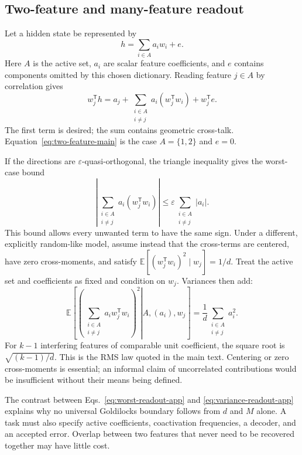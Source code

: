 \documentclass[
  aps,
  reprint,
  superscriptaddress,
  floatfix,
  nofootinbib,
  longbibliography
]{revtex4-2}
\newcommand{\E}{\mathbb{E}}
\newcommand{\T}{^{\mathsf T}}
\begin{document}
\subsection{Two-feature and many-feature readout}

Let a hidden state be represented by
\begin{equation}
 h=\sum_{i\in A}a_iw_i+e.
 \label{eq:feature-code-app}
\end{equation}
Here $A$ is the active set, $a_i$ are scalar feature coefficients, and $e$ contains
components omitted by this chosen dictionary.  Reading feature $j\in A$ by
correlation gives
\begin{equation}
 w_j\T h
 =a_j+\sum_{\substack{i\in A\\i\ne j}}
 a_i(w_j\T w_i)+w_j\T e.
 \label{eq:readout-app}
\end{equation}
The first term is desired; the sum contains geometric cross-talk.
Equation~\eqref{eq:two-feature-main} is the case $A=\{1,2\}$ and $e=0$.

If the directions are $\varepsilon$-quasi-orthogonal, the triangle inequality
gives the worst-case bound
\begin{equation}
 \left|
 \sum_{\substack{i\in A\\i\ne j}}a_i(w_j\T w_i)
 \right|
 \leq\varepsilon\sum_{\substack{i\in A\\i\ne j}}|a_i|.
 \label{eq:worst-readout-app}
\end{equation}
This bound allows every unwanted term to have the same sign.  Under a
different, explicitly random-like model, assume instead that the cross-terms
are centered, have zero cross-moments, and satisfy
$\E[(w_j\T w_i)^2\mid w_j]=1/d$.  Treat the active set and coefficients as fixed
and condition on $w_j$.  Variances then add:
\begin{equation}
 \E\!\left[
 \left.
 \left(\sum_{\substack{i\in A\\i\ne j}}a_iw_j\T w_i\right)^2
 \right|A,(a_i),w_j
 \right]
 =\frac1d\sum_{\substack{i\in A\\i\ne j}}a_i^2.
 \label{eq:variance-readout-app}
\end{equation}
For $k-1$ interfering features of comparable unit coefficient, the square root
is $\sqrt{(k-1)/d}$.  This is the RMS law quoted in the main text.  Centering
or zero cross-moments is essential; an informal claim of uncorrelated
contributions would be insufficient without their means being defined.

The contrast between Eqs.~\eqref{eq:worst-readout-app} and
\eqref{eq:variance-readout-app} explains why no universal Goldilocks boundary
follows from $d$ and $M$ alone.  A task must also specify active coefficients,
coactivation frequencies, a decoder, and an accepted error.  Overlap between
two features that never need to be recovered together may have little cost.
\end{document}
